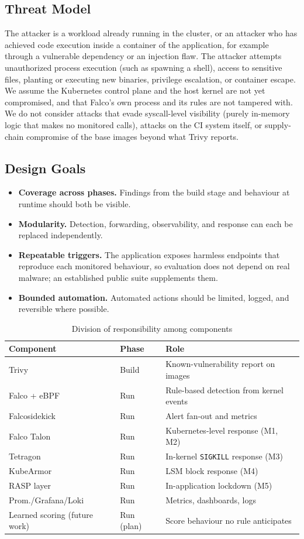 \documentclass[10pt,conference]{IEEEtran}
\begin{document}
\subsection{Threat Model}
The attacker is a workload already running in the cluster, or an attacker who has achieved code execution inside a container of the application, for example through a vulnerable dependency or an injection flaw. The attacker attempts unauthorized process execution (such as spawning a shell), access to sensitive files, planting or executing new binaries, privilege escalation, or container escape. We assume the Kubernetes control plane and the host kernel are not yet compromised, and that Falco's own process and its rules are not tampered with. We do not consider attacks that evade syscall-level visibility (purely in-memory logic that makes no monitored calls), attacks on the CI system itself, or supply-chain compromise of the base images beyond what Trivy reports.

\subsection{Design Goals}
\begin{itemize}
\item \textbf{Coverage across phases.} Findings from the build stage and behaviour at runtime should both be visible.
\item \textbf{Modularity.} Detection, forwarding, observability, and response can each be replaced independently.
\item \textbf{Repeatable triggers.} The application exposes harmless endpoints that reproduce each monitored behaviour, so evaluation does not depend on real malware; an established public suite supplements them.
\item \textbf{Bounded automation.} Automated actions should be limited, logged, and reversible where possible.
\end{itemize}

\begin{table}[t]
\caption{Division of responsibility among components}
\label{tab:resp}
\centering
\begin{tabular}{@{}lll@{}}
\toprule
Component & Phase & Role\\
\midrule
Trivy & Build & Known-vulnerability report on images\\
Falco + eBPF & Run & Rule-based detection from kernel events\\
Falcosidekick & Run & Alert fan-out and metrics\\
Falco Talon & Run & Kubernetes-level response (M1, M2)\\
Tetragon & Run & In-kernel \texttt{SIGKILL} response (M3)\\
KubeArmor & Run & LSM block response (M4)\\
RASP layer & Run & In-application lockdown (M5)\\
Prom./Grafana/Loki & Run & Metrics, dashboards, logs\\
Learned scoring (future work) & Run (plan) & Score behaviour no rule anticipates\\
\bottomrule
\end{tabular}
\end{table}
\end{document}
